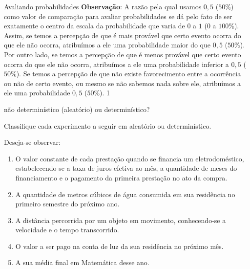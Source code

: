 \begin{answer}{Avaliando probabilidades}
{  \textbf{Observação}: A razão pela qual usamos $0{,}5$ ($50\%$) como valor de comparação para avaliar probabilidades se dá pelo fato de ser exatamente o centro da escala da probabilidade que varia de $0$ a $1$ ($0$ a $100\%$). Assim, se temos a percepção de que é mais provável que certo evento ocorra do que ele não ocorra, atribuímos a ele uma probabilidade maior do que $0{,}5$ ($50\%$). Por outro lado, se temos a percepção de que é menos provável que certo evento ocorra do que ele não ocorra, atribuímos a ele uma probabilidade inferior a $0{,}5$ ($50\%$). Se temos a percepção de que não existe favorecimento entre a ocorrência ou não de certo evento, ou mesmo se não sabemos nada sobre ele, atribuímos a ele uma probabilidade $0{,}5$ ($50\%$).
}{1}
\end{answer}

\begin{task}{não determinístico (aleatório) ou determinístico?}

Classifique cada experimento a seguir em aleatório ou determinístico.

Deseja-se observar:
\begin{enumerate}[rightmargin=3mm]
\item 
O valor constante de cada prestação quando se financia um eletrodoméstico, estabelecendo-se a taxa de juros efetiva ao mês, a quantidade de meses do financiamento e o pagamento da primeira prestação no ato da compra.

\item 
A quantidade de metros cúbicos de água consumida em sua residência no primeiro semestre do próximo ano.


\item 
A distância percorrida por um objeto em movimento, conhecendo-se a velocidade e o tempo transcorrido.

\item 
O valor a ser pago na conta de luz da sua residência no próximo mês.

\item 
A sua média final em Matemática desse ano.

\end{enumerate}
\end{task}
